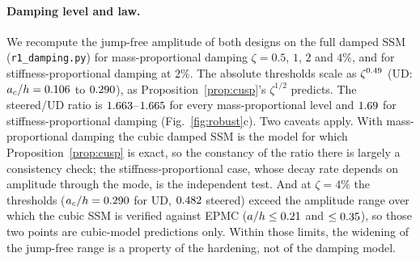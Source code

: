 \paragraph{Damping level and law.} We recompute the jump-free amplitude of both designs on the full
damped SSM (\texttt{r1\_\allowbreak damping.py}) for mass-proportional damping $\zeta=0.5$, $1$, $2$
and $4\%$, and for stiffness-proportional damping at $2\%$. The absolute thresholds scale as
$\zeta^{0.49}$ (UD: $a_c/h=0.106$ to $0.290$), as Proposition~\ref{prop:cusp}'s
$\zeta^{1/2}$ predicts. The steered/UD ratio is $1.663$--$1.665$ for every
mass-proportional level and $1.69$ for stiffness-proportional damping
(Fig.~\ref{fig:robust}c). Two caveats apply. With mass-proportional damping the cubic damped SSM is the
model for which Proposition~\ref{prop:cusp} is exact, so the constancy of the ratio there is largely a
consistency check; the stiffness-proportional case, whose decay rate depends on amplitude through the
mode, is the independent test. And at $\zeta=4\%$ the thresholds ($a_c/h=0.290$ for UD,
$0.482$ steered) exceed the amplitude range over which the cubic SSM is verified against EPMC
($a/h\le0.21$ and $\le0.35$), so those two points are cubic-model predictions only.
Within those limits, the widening of the jump-free range is a property of the hardening, not of the
damping model.

